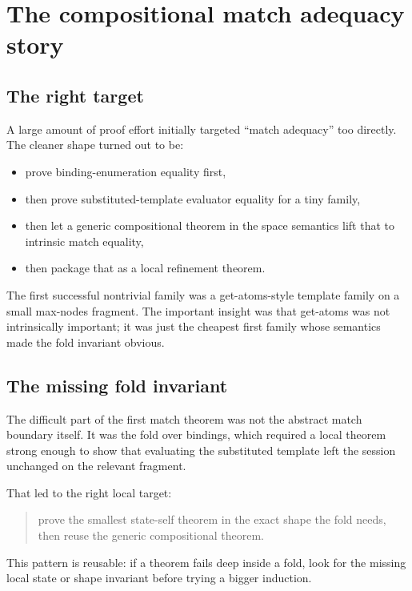 \documentclass[11pt]{article}
\begin{document}
\section{The compositional match adequacy story}

\subsection{The right target}

A large amount of proof effort initially targeted ``match adequacy'' too directly. The cleaner shape turned out to be:

\begin{itemize}
  \item prove binding-enumeration equality first,
  \item then prove substituted-template evaluator equality for a tiny family,
  \item then let a generic compositional theorem in the space semantics lift that to intrinsic match equality,
  \item then package that as a local refinement theorem.
\end{itemize}

The first successful nontrivial family was a get-atoms-style template family on a small max-nodes fragment. The important insight was that get-atoms was not intrinsically important; it was just the cheapest first family whose semantics made the fold invariant obvious.

\subsection{The missing fold invariant}

The difficult part of the first match theorem was not the abstract match boundary itself. It was the fold over bindings, which required a local theorem strong enough to show that evaluating the substituted template left the session unchanged on the relevant fragment.

That led to the right local target:

\begin{quote}
prove the smallest state-self theorem in the exact shape the fold needs, then reuse the generic compositional theorem.
\end{quote}

This pattern is reusable: if a theorem fails deep inside a fold, look for the missing local state or shape invariant before trying a bigger induction.
\end{document}
